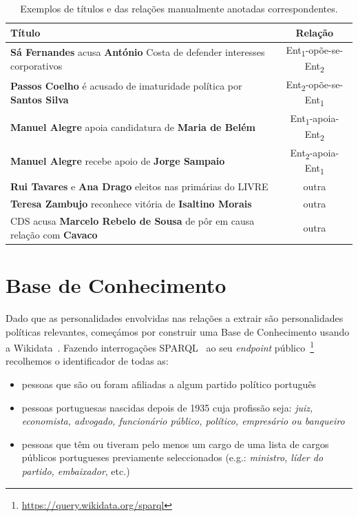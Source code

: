 \documentclass[a4paper, twocolumn, 11pt, twoside]{article}
\begin{document}
\begin{table}[!h]
  \centering
  \begin{tabular}{lc}
      {\bf Título} & {\bf Relação} \\
      \hline
	  \textbf{Sá Fernandes} acusa \textbf{António} Costa de defender interesses corporativos &	Ent\textsubscript{1}-opõe-se-Ent\textsubscript{2} \\
	  \textbf{Passos Coelho} é acusado de imaturidade política por \textbf{Santos Silva} &	Ent\textsubscript{2}-opõe-se-Ent\textsubscript{1}	\\
	  \textbf{Manuel Alegre} apoia candidatura de \textbf{Maria de Belém} &	Ent\textsubscript{1}-apoia-Ent\textsubscript{2}	\\
	  \textbf{Manuel Alegre} recebe apoio de \textbf{Jorge Sampaio} & Ent\textsubscript{2}-apoia-Ent\textsubscript{1}	\\
	  \textbf{Rui Tavares} e \textbf{Ana Drago} eleitos nas primárias do LIVRE & outra	\\
	  \textbf{Teresa Zambujo} reconhece vitória de \textbf{Isaltino Morais} & outra	\\
	  CDS acusa \textbf{Marcelo Rebelo de Sousa} de pôr em causa relação com \textbf{Cavaco} & outra \\
	  \hline
  \end{tabular}
  \caption{Exemplos de títulos e das relações manualmente anotadas correspondentes.}
  \label{tab:samples}
\end{table}


\section{Base de Conhecimento}
\label{sec_kb}
Dado que as personalidades envolvidas nas relações a extrair são personalidades políticas relevantes, começámos por construir uma Base de Conhecimento usando a Wikidata~\citep{MKGGB2018}. Fazendo interrogações SPARQL~\cite{2013sparql} ao seu \textit{endpoint} público~\footnote{\url{https://query.wikidata.org/sparql}} recolhemos o identificador de todas as:

\begin{itemize}  
\item pessoas que são ou foram afiliadas a algum partido político português
\item pessoas portuguesas nascidas depois de 1935 cuja profissão seja: \textit{juiz, economista, advogado, funcionário público, político, empresário ou banqueiro}
\item pessoas que têm ou tiveram pelo menos um cargo de uma lista de cargos públicos portugueses previamente seleccionados (e.g.: \textit{ministro, líder do partido, embaixador}, etc.)
\end{itemize}  
\end{document}
